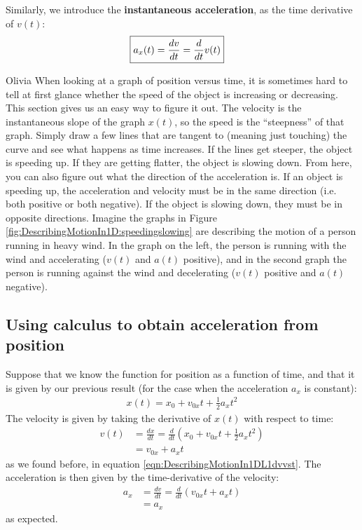 Similarly, we introduce the \textbf{instantaneous acceleration}, as the time derivative of $v(t)$:
\begin{align}
\Aboxed{a_x(t)=\frac{dv}{dt}=\frac{d}{dt}v(t)}
\end{align}

\begin{studentOpinion}{Olivia}
When looking at a graph of position versus time, it is sometimes hard to tell at first glance whether the speed of the object is increasing or decreasing. This section gives us an easy way to figure it out. The velocity is the instantaneous slope of the graph $x(t)$, so the speed is the ``steepness'' of that graph. Simply draw a few lines that are tangent to (meaning just touching) the curve and see what happens as time increases. If the lines get steeper, the object is speeding up. If they are getting flatter, the object is slowing down.
From here, you can also figure out what the direction of the acceleration is. If an object is speeding up, the acceleration and velocity must be in the same direction (i.e. both positive or both negative). If the object is slowing down, they must be in opposite directions. Imagine the graphs in Figure \ref{fig:DescribingMotionIn1D:speedingslowing} are describing the motion of a person running in heavy wind. In the graph on the left, the person is running with the wind and accelerating ($v(t)$ and $a(t)$ positive), and in the second graph the person is running against the wind and decelerating ($v(t)$ positive and $a(t)$ negative). 
\end{studentOpinion} 



\subsection{Using calculus to obtain acceleration from position}
\label{sec:DescribingMotionIn1D:calca}
Suppose that we know the function for position as a function of time, and that it is given by our previous result (for the case when the acceleration $a_x$ is constant):
\begin{align*}
x(t)=x_0+v_{0x}t+\frac{1}{2}a_xt^2
\end{align*}
The velocity is given by taking the derivative of $x(t)$ with respect to time:
\begin{align*}
v(t)&=\frac{dx}{dt}=\frac{d}{dt}\left(x_0+v_{0x}t+\frac{1}{2}a_xt^2\right)\\
&=v_{0x}+a_xt
\end{align*}
as we found before, in equation \ref{eqn:DescribingMotionIn1DL1dvvst}. The acceleration is then given by the time-derivative of the velocity:
\begin{align*}
a_x &= \frac{dv}{dt}=\frac{d}{dt}\left(v_{0x}t+a_xt\right)\\
&=a_x
\end{align*}
as expected.


